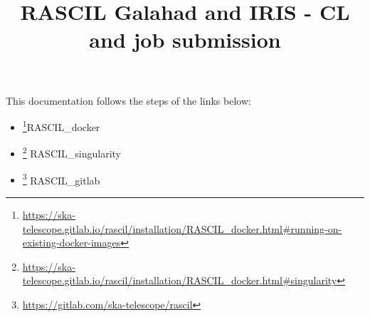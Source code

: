 \documentclass[english]{article}
\begin{document}
\title{ RASCIL Galahad and IRIS - CL and job submission}

\maketitle  



This documentation follows the steps of the links below:
\begin{itemize}
    \item \footnote{\url{https://ska-telescope.gitlab.io/rascil/installation/RASCIL\_docker.html\#running-on-existing-docker-images}}RASCIL\_docker
    
    \item \footnote{\url{https://ska-telescope.gitlab.io/rascil/installation/RASCIL\_docker.html\#singularity}} RASCIL\_singularity
    
    \item \footnote{\url{https://gitlab.com/ska-telescope/rascil}} RASCIL\_gitlab

\end{itemize}
\end{document}
